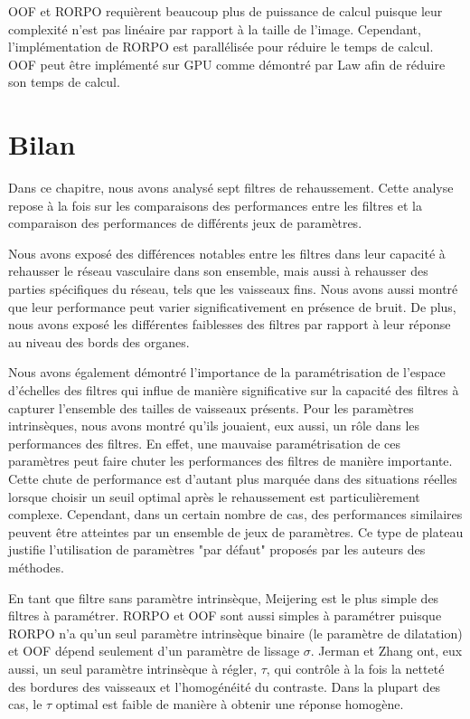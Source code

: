 OOF et RORPO requièrent beaucoup plus de puissance de calcul puisque leur complexité n'est pas linéaire par rapport à la taille de l'image. Cependant, l'implémentation de RORPO est parallélisée pour réduire le temps de calcul. OOF peut être implémenté sur GPU comme démontré par Law \cite{Law2009_efficient_implementation} afin de réduire son temps de calcul.

\section{Bilan}

Dans ce chapitre, nous avons analysé sept filtres de rehaussement. Cette analyse repose à la fois sur les comparaisons des performances entre les filtres et la comparaison des performances de différents jeux de paramètres. 

Nous avons exposé des différences notables entre les filtres dans leur capacité à rehausser le réseau vasculaire dans son ensemble, mais aussi à rehausser des parties spécifiques du réseau, tels que les vaisseaux fins. Nous avons aussi montré que leur performance peut varier significativement en présence de bruit. De plus, nous avons exposé les différentes faiblesses des filtres par rapport à leur réponse au niveau des bords des organes.

Nous avons également démontré l'importance de la paramétrisation de l'espace d'échelles des filtres qui influe de manière significative sur la capacité des filtres à capturer l'ensemble des tailles de vaisseaux présents. Pour les paramètres intrinsèques, nous avons montré qu'ils jouaient, eux aussi, un rôle dans les performances des filtres. En effet, une mauvaise paramétrisation de ces paramètres peut faire chuter les performances des filtres de manière importante. Cette chute de performance est d'autant plus marquée dans des situations réelles lorsque choisir un seuil optimal après le rehaussement est particulièrement complexe. Cependant, dans un certain nombre de cas, des performances similaires peuvent être atteintes par un ensemble de jeux de paramètres. Ce type de plateau justifie l'utilisation de paramètres "par défaut" proposés par les auteurs des méthodes.   

En tant que filtre sans paramètre intrinsèque, Meijering est le plus simple des filtres à paramétrer. RORPO et OOF sont aussi simples à paramétrer puisque RORPO n'a qu'un seul paramètre intrinsèque binaire (le paramètre de dilatation) et OOF dépend seulement d'un paramètre de lissage $\sigma$. Jerman et Zhang ont, eux aussi, un seul paramètre intrinsèque à régler, $\tau$, qui contrôle à la fois la netteté des bordures des vaisseaux et l'homogénéité du contraste. Dans la plupart des cas, le $\tau$ optimal est faible de manière à obtenir une réponse homogène. 

